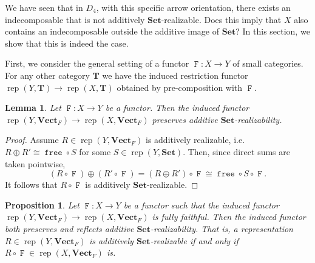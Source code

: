 \documentclass[a4paper]{amsart}
\theoremstyle{plain}
\newtheorem{lemma}[theorem]{Lemma}
\newtheorem{proposition}[theorem]{Proposition}
\theoremstyle{definition}
\theoremstyle{remark}
\newcommand{\funct}[1]{\operatorname{\mathtt{#1}}}
\newcommand{\Set}{\mathbf{Set}}
\newcommand{\VectF}{\mathbf{Vect}_F}
\DeclareMathOperator{\rep}{rep}
\begin{document}
We have seen that in \(D_4\), with this specific arrow orientation, there exists an indecomposable that is not additively \(\Set\)-realizable. Does this imply that \(X\) also contains an indecomposable outside the additive image of \(\Set\)? In this section, we show that this is indeed the case.  


First, we consider the general setting of a functor \( \funct{F} \colon X \to Y \) of small categories. For any other category \( \mathbf{T} \) we have the induced restriction functor \( \rep(Y, \mathbf{T}) \to \rep(X, \mathbf{T}) \) obtained by pre-composition with $\funct{F}$. %

\begin{lemma} \label{lemma:restriction_preserves_realizable}
Let \( \funct{F} \colon X \to Y \) be a functor. Then the induced functor \( \rep(Y, \VectF) \to \rep(X, \VectF) \) preserves additive \( \Set \)-realizability. 
\end{lemma}

\begin{proof}
Assume \( R \in \rep(Y, \VectF) \) is additively realizable, i.e. $R\oplus R' \cong \funct{free} \circ S$ for some $S\in \rep(Y, \Set)$. Then, 
since direct sums are taken pointwise,
\[(R\circ \funct{F})\oplus (R'\circ \funct{F}) = (R\oplus R')\circ \funct{F} \cong \funct{free} \circ S \circ\funct{F}.\]
It follows that $R\circ \funct{F}$ is additively $\Set$-realizable.
\end{proof}

\begin{proposition} \label{prop:restriction_preserves_realizability}
Let \( \funct{F} \colon X \to Y \) be a functor such that the induced functor \( \rep(Y, \VectF) \to \rep(X, \VectF) \) is fully faithful. Then the induced functor both \emph{preserves} and \emph{reflects} additive \( \Set \)-realizability. That is, a representation \( R \in \rep(Y, \VectF) \) is additively \( \Set \)-realizable if and only if \( R \circ \funct{F} \in \rep(X, \VectF) \) is.
\end{proposition}
\end{document}
